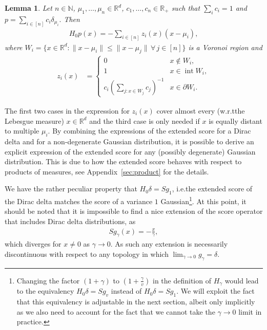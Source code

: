 \documentclass{article}
\newcommand{\R}{\mathbb{R}}
\theoremstyle{plain}
\newtheorem{lemma}[theorem]{Lemma}
\theoremstyle{definition}
\theoremstyle{remark}
\newcommand{\N}{\mathbb{N}}
\begin{document}
\begin{samepage}
\begin{lemma}\label{lem:Dirac_mix}
    Let $n\in\N$, $\mu_1,\dots,\mu_n\in\R^d$, $c_1,\dots,c_n\in\R_+$ such that $\sum_i c_i=1$ and 
   \(
        p=\sum_{i\in[n]} c_i\delta_{\mu_i}.
    \)
    Then
        \begin{align*}
        H_0p(x) = -\sum_{i\in[n]} z_i(x)(x-\mu_i),
    \end{align*}
    where $W_i=\{x\in\R^d\colon \|x-\mu_i\|\leq\|x-\mu_j\|\,\forall\,j\in[n]\}$ is a Voronoi region and
    \begin{align*}
        z_i(x)
        &=\begin{cases}
            0 & x\notin W_i,\\
            1 & x\in \operatorname{int} W_i,\\
            c_i\left(\sum_{j:x\in W_j} c_j\right)^{-1} & x\in \partial W_i.
        \end{cases}
    \end{align*} 
    \end{lemma}
\end{samepage}
    
The first two cases  in the expression for $z_i(x)$ cover almost every (w.r.t\@ the Lebesgue measure) $x\in\R^d$ and the third case is only needed if $x$ is equally distant to multiple $\mu_i$.
By combining the expressions of the extended score for a Dirac delta and for a non-degenerate Gaussian distribution, it is possible to derive an explicit expression of the extended score for any (possibly degenerate) Gaussian distribution. This is due to how the extended score behaves with respect to products of measures, see Appendix~\ref{sec:product} for the details.



We have the rather peculiar property that $H_0\delta = Sg_1$, i.e.\@ the extended score of the Dirac delta matches the score of a variance $1$ Gaussian\footnote{Changing the factor $(1+\gamma)$ to $(1+\tfrac{\gamma}{v})$ in the definition of $H_\gamma$ would lead to the equivalency $H_0\delta = Sg_v$ instead of $H_0\delta = Sg_1$. We will exploit the fact that this equivalency is adjustable in the next section, albeit only implicitly as we also need to account for the fact that we cannot take the $\gamma\to 0$ limit in practice.}. At this point, it should be noted that it is impossible to find a nice extension of the score operator that includes Dirac delta distributions, as
\begin{align*}
    Sg_\gamma(x)=-\tfrac{x}{\gamma},
\end{align*}
which diverges for $x\neq 0$ as $\gamma\to 0$. As such any extension is necessarily discontinuous with respect to any topology in which $\lim_{\gamma\to 0}g_\gamma=\delta$.
\end{document}
